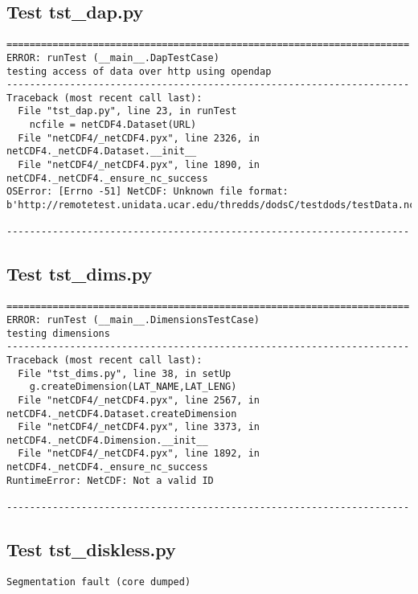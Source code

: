 \subsection{Test tst\_dap.py}

\begin{verbatim}
======================================================================
ERROR: runTest (__main__.DapTestCase)
testing access of data over http using opendap
----------------------------------------------------------------------
Traceback (most recent call last):
  File "tst_dap.py", line 23, in runTest
    ncfile = netCDF4.Dataset(URL)
  File "netCDF4/_netCDF4.pyx", line 2326, in netCDF4._netCDF4.Dataset.__init__
  File "netCDF4/_netCDF4.pyx", line 1890, in netCDF4._netCDF4._ensure_nc_success
OSError: [Errno -51] NetCDF: Unknown file format: b'http://remotetest.unidata.ucar.edu/thredds/dodsC/testdods/testData.nc'

----------------------------------------------------------------------

\end{verbatim}

\subsection{Test tst\_dims.py}

\begin{verbatim}
======================================================================
ERROR: runTest (__main__.DimensionsTestCase)
testing dimensions
----------------------------------------------------------------------
Traceback (most recent call last):
  File "tst_dims.py", line 38, in setUp
    g.createDimension(LAT_NAME,LAT_LENG)
  File "netCDF4/_netCDF4.pyx", line 2567, in netCDF4._netCDF4.Dataset.createDimension
  File "netCDF4/_netCDF4.pyx", line 3373, in netCDF4._netCDF4.Dimension.__init__
  File "netCDF4/_netCDF4.pyx", line 1892, in netCDF4._netCDF4._ensure_nc_success
RuntimeError: NetCDF: Not a valid ID

----------------------------------------------------------------------

\end{verbatim}

\subsection{Test tst\_diskless.py}

\begin{verbatim}
Segmentation fault (core dumped)
\end{verbatim}

